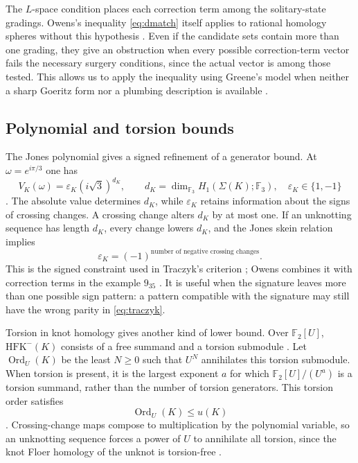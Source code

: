 \documentclass[12pt, oneside]{amsart}
\newcommand{\dbc}{\Sigma}
\begin{document}
The $L$-space condition places each correction term among the solitary-state
gradings. Owens's inequality \eqref{eq:dmatch} itself applies to rational
homology spheres without this hypothesis \cite[Thms.~4.1 and~5]{Owens}.
Even if the candidate sets contain more than one grading, they give an
obstruction when every possible correction-term vector fails the necessary
surgery conditions, since the actual vector is among those tested. This
allows us to apply the inequality using Greene's model when neither a sharp
Goeritz form nor a plumbing description is available
\cite[Thms.~4.1 and~5]{Owens}.

\subsection{Polynomial and torsion bounds}

The Jones polynomial gives a signed refinement of a generator bound. At
$\omega=e^{i\pi/3}$ one has
\begin{equation}\label{eq:lm}
    V_K(\omega)=\varepsilon_K(i\sqrt3)^{d_K},\qquad
    d_K=\dim_{\mathbb F_3}H_1(\dbc(K);\mathbb F_3),\quad
    \varepsilon_K\in\{1,-1\}
\end{equation}
\cite{LM,Jones}. The absolute value determines $d_K$, while $\varepsilon_K$ retains
information about the signs of crossing changes. A crossing change alters $d_K$ by
at most one. If an unknotting sequence has length $d_K$, every change lowers $d_K$,
and the Jones skein relation implies
\begin{equation}\label{eq:traczyk}
    \varepsilon_K=(-1)^{\text{number of negative crossing changes}}.
\end{equation}
This is the signed constraint used in Traczyk's criterion \cite{Traczyk}; Owens combines
it with correction terms in the example $9_{35}$ \cite{Owens}. It is useful when the
signature leaves more than one possible sign pattern: a pattern compatible with the
signature may still have the wrong parity in \eqref{eq:traczyk}.

Torsion in knot homology gives another kind of lower bound. Over $\mathbb F_2[U]$,
$\mathrm{HFK}^-(K)$ consists of a free summand and a torsion submodule
\cite[Def.~1.1]{JMZ}. Let $\operatorname{Ord}_U(K)$ be the least $N\ge0$ such that $U^N$
annihilates this torsion submodule. When torsion is present, it is the largest exponent $a$ for which
$\mathbb F_2[U]/(U^a)$ is a torsion summand, rather than the number of torsion generators.
This torsion order satisfies
\begin{equation}\label{eq:torsion}
    \operatorname{Ord}_U(K)\le u(K)
\end{equation}
\cite{AE,JMZ}. Crossing-change maps compose to multiplication by the
polynomial variable, so an unknotting sequence forces a power of $U$ to
annihilate all torsion, since the knot Floer homology of the unknot is torsion-free
\cite[\S4]{AE}.
\end{document}
